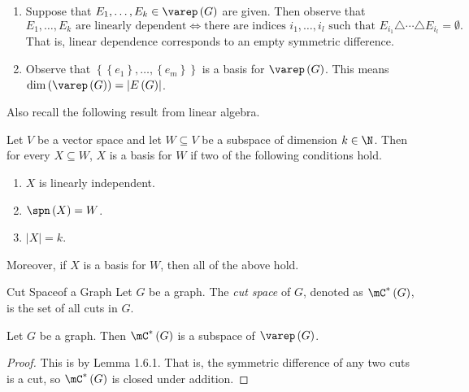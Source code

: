 \documentclass[co342]{subfiles}
\begin{document}
\begin{enumerate}
        \item Suppose that $E_1,\ldots,E_k\in\varep\left( G \right)$ are given. Then observe that
            \begin{equation*}
                E_1,\ldots,E_k\text{ are linearly dependent} \iff \text{there are indices }i_1,\ldots,i_l\text{ such that } E_{i_1}\triangle\cdots\triangle E_{i_l} = \emptyset.
            \end{equation*}
            That is, linear dependence corresponds to an empty symmetric difference.
        \item Observe that $\left\lbrace \left\lbrace e_1 \right\rbrace, \ldots, \left\lbrace e_m \right\rbrace \right\rbrace$ is a basis for $\varep\left( G \right)$. This means $\dim\left( \varep\left( G \right) \right)=\left| E\left( G \right) \right|$.
    \end{enumerate}
    Also recall the following result from linear algebra.

    \begin{prop}{}
        Let $V$ be a vector space and let $W\subseteq V$ be a subspace of dimension $k\in\N$. Then for every $X\subseteq W$, $X$ is a basis for $W$ if two of the following conditions hold.
        \begin{enumerate}
            \item $X$ is linearly independent.
            \item $\spn\left( X \right)=W$.
            \item $\left| X \right|=k$.
        \end{enumerate}
        Moreover, if $X$ is a basis for $W$, then all of the above hold.
    \end{prop}

    \begin{definition}{Cut Space}{of a Graph}
        Let $G$ be a graph. The \emph{cut space} of $G$, denoted as $\mC^{*}\left( G \right)$, is the set of all cuts in $G$.
    \end{definition}
    
    \begin{prop}{}
        Let $G$ be a graph. Then $\mC^{*}\left( G \right)$ is a subspace of $\varep\left( G \right)$.
    \end{prop}

    \begin{proof}
        This is by Lemma 1.6.1. That is, the symmetric difference of any two cuts is a cut, so $\mC^{*}\left( G \right)$ is closed under addition.
    \end{proof}
\end{document}
